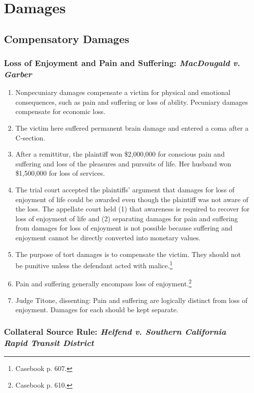 \section{Damages}

\subsection{Compensatory Damages}
 
\subsubsection{Loss of Enjoyment and Pain and Suffering: \emph{MacDougald v.  
Garber}}

\begin{enumerate}
    \item Nonpecuniary damages compensate a victim for physical and emotional 
    consequences, such as pain and suffering or loss of ability. Pecuniary 
    damages compensate for economic loss.
    \item The victim here suffered permanent brain damage and entered a coma 
    after a C-section.
    \item After a remittitur, the plaintiff won \$2,000,000 for conscious pain 
    and suffering and loss of the pleasures and pursuits of life. Her husband 
    won \$1,500,000 for loss of services.
    \item The trial court accepted the plaintiffs' argument that damages for 
    loss of enjoyment of life could be awarded even though the plaintiff was not 
    aware of the loss. The appellate court held (1) that awareness is required 
    to recover for loss of enjoyment of life and (2) separating damages for pain 
    and suffering from damages for loss of enjoyment is not possible because 
    suffering and enjoyment cannot be directly converted into monetary values.
    \item The purpose of tort damages is to compensate the victim. They should 
    not be punitive unless the defendant acted with malice.\footnote{Casebook p. 
    607.}
    \item Pain and suffering generally encompass loss of 
    enjoyment.\footnote{Casebook p. 610.}
    \item Judge Titone, dissenting: Pain and suffering are logically distinct 
    from loss of enjoyment. Damages for each should be kept separate.
\end{enumerate}

\subsubsection{Collateral Source Rule: \emph{Helfend v. Southern California 
Rapid Transit District}}

